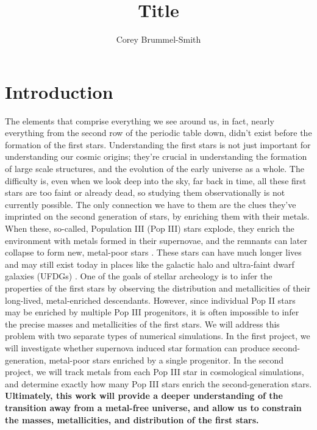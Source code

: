 \documentclass[a4paper, 12pt]{article}
\begin{document}
\fontsize{12}{16}\selectfont
\author{Corey Brummel-Smith}
\title{Title}



\section{Introduction}

The elements that comprise everything we see around us, in fact, nearly everything from the second row of the periodic table down, didn't exist before the formation of the first stars. Understanding the first stars is not just important for understanding our cosmic origins; they're crucial in understanding the formation of large scale structures, and the evolution of the early universe as a whole. The difficulty is, even when we look deep into the sky, far back in time, all these first stars are too faint or already dead, so studying them observationally is not currently possible. The only connection we have to them are the clues they've imprinted on the second generation of stars, by enriching them with their metals. When these, so-called, Population III (Pop III) stars explode, they enrich the environment with metals formed in their supernovae, and the remnants can later collapse to form new, metal-poor stars \citep{Chiaki2019}. These stars can have much longer lives and may still exist today in places like the galactic halo and ultra-faint dwarf galaxies (UFDGs) \citep{Kirby2008}. One of the goals of stellar archeology is to infer the properties of the first stars by observing the distribution and metallicities of their long-lived, metal-enriched descendants. However, since individual Pop II stars may be enriched by multiple Pop III progenitors, it is often impossible to infer the precise masses and metallicities of the first stars. We will address this problem with two separate types of numerical simulations. In the first project, we will investigate whether supernova induced star formation can produce second-generation, metal-poor stars enriched by a single progenitor. In the second project, we will track metals from each Pop III star in cosmological simulations, and determine exactly how many Pop III stars enrich the second-generation stars. \textbf{Ultimately, this work will provide a deeper understanding of the transition away from a metal-free universe, and allow us to constrain the masses, metallicities, and distribution of the first stars.}
\end{document}
